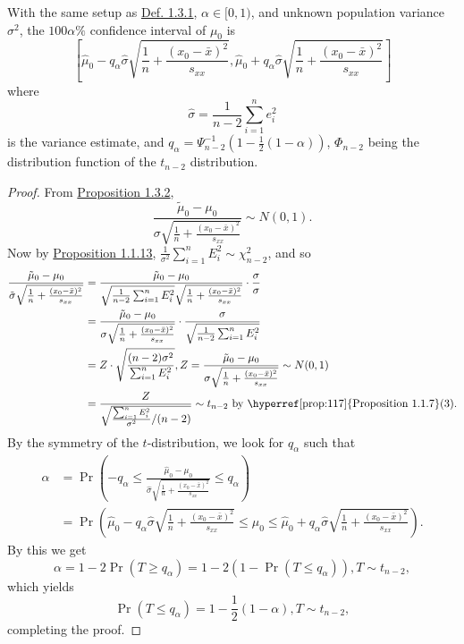 \documentclass[11pt,fleqn]{book} %
\begin{document}
\begin{proposition} \label{prop:134}
With the same setup as \hyperref[def:131]{Def. 1.3.1}, \(\alpha \in [0, 1)\), and unknown population variance \(\sigma^2\), the \(100\alpha\%\) confidence interval of \(\mu_0\) is
\[
\left[\hat{\mu}_0 - q_\alpha\hat{\sigma}\sqrt{\frac1n + \frac{(x_0 - \bar{x})^2}{s_{xx}}}, \hat{\mu}_0 + q_\alpha\hat{\sigma}\sqrt{\frac1n + \frac{(x_0 - \bar{x})^2}{s_{xx}}}\right]
\]
where
\[
\hat{\sigma} = \frac{1}{n - 2}\sum_{i=1}^ne_i^2
\]
is the variance estimate, and \(q_\alpha = \Psi^{-1}_{n - 2}\left(1 - \frac12(1 - \alpha)\right)\), \(\Phi_{n - 2}\) being the distribution function of the \(t_{n-2}\) distribution.
\end{proposition}
\begin{proof} From \hyperref[prop:132]{Proposition 1.3.2},
\[
\frac{\tilde{\mu}_0 - \mu_0}{\sigma\sqrt{\frac1n + \frac{(x_0 - \bar{x})^2}{s_{xx}}}} \sim N(0, 1).
\]
\indent Now by \hyperref[prop:1113]{Proposition 1.1.13}, \(\frac{1}{\sigma^2}\sum_{i=1}^nE_i^2 \sim \chi^2_{n - 2}\), and so
\[
\begin{aligned}
\frac{\tilde{\mu}_0 - \mu_0}{\tilde{\sigma}\sqrt{\frac1n + \frac{(x_0 - \bar{x})^2}{s_{xx}}}} &= \frac{\tilde{\mu}_0 - \mu_0}{\sqrt{\frac{1}{n - 2}\sum_{i=1}^nE_i^2}\sqrt{\frac1n + \frac{(x_0 - \bar{x})^2}{s_{xx}}}} \cdot \frac{\sigma}{\sigma} \\
&= \frac{\tilde{\mu}_0 - \mu_0}{\sigma\sqrt{\frac1n + \frac{(x_0 - \bar{x})^2}{s_{xx}}}} \cdot\frac{\sigma}{\sqrt{\frac{1}{n - 2}\sum_{i=1}^nE_i^2}} \\
&= Z \cdot \sqrt{\frac{(n - 2)\sigma^2}{\sum_{i=1}^nE_i^2}}, Z = \frac{\tilde{\mu}_0 - \mu_0}{\sigma\sqrt{\frac1n + \frac{(x_0 - \bar{x})^2}{s_{xx}}}} \sim N(0, 1) \\
&= \frac{Z}{\sqrt{\frac{\sum_{i=1}^nE_i^2}{\sigma^2}/(n - 2)}} \sim t_{n-2} \text{ by \hyperref[prop:117]{Proposition 1.1.7}(3)}.
\end{aligned}
\]
\indent By the symmetry of the \(t\)-distribution, we look for \(q_\alpha\) such that
\[
\begin{aligned}
\alpha &= \Pr\left(-q_\alpha \leq \frac{\hat{\mu}_0 - \mu_0}{\hat{\sigma}\sqrt{\frac1n + \frac{(x_0 - \bar{x})^2}{s_{xx}}}} \leq q_\alpha\right) \\
&= \Pr\left(\hat{\mu}_0 - q_\alpha\hat{\sigma}\sqrt{\frac1n + \frac{(x_0 - \bar{x})^2}{s_{xx}}} \leq \mu_0 \leq \hat{\mu}_0 + q_\alpha\hat{\sigma}\sqrt{\frac1n + \frac{(x_0 - \bar{x})^2}{s_{xx}}}\right).
\end{aligned}
\]
\indent By this we get
\[
\alpha = 1 - 2\Pr(T \geq q_\alpha) = 1 - 2(1 - \Pr(T \leq q_\alpha)), T \sim t_{n - 2},
\]
which yields
\[
\Pr(T \leq q_\alpha) = 1 - \frac12(1 - \alpha), T \sim t_{n - 2},
\]
completing the proof.
\end{proof}
\end{document}
